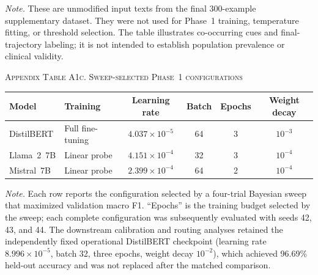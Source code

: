 \documentclass{ieeeaccess}
\begin{document}
\noindent\footnotesize\textit{Note.} These are unmodified input texts from the final 300-example supplementary dataset. They were not used for Phase~1 training, temperature fitting, or threshold selection. The table illustrates co-occurring cues and final-trajectory labeling; it is not intended to establish population prevalence or clinical validity.\normalsize
\par\medskip

\noindent\textsc{Appendix Table A1c. Sweep-selected Phase~1 configurations}\par
\label{tab:appendix-a1c-phase1-configurations}
\smallskip
\footnotesize
\setlength{\tabcolsep}{5pt}
\renewcommand{\arraystretch}{1.14}
\noindent\begin{tabularx}{\textwidth}{@{}>{\raggedright\arraybackslash}p{}>{\raggedright\arraybackslash}Y c c c c@{}}
\toprule
Model & Training & Learning rate & Batch & Epochs & Weight decay \\
\midrule
DistilBERT & Full fine-tuning & $4.037\times10^{-5}$ & 64 & 3 & $10^{-3}$ \\
Llama~2~7B & Linear probe & $4.151\times10^{-4}$ & 32 & 3 & $10^{-4}$ \\
Mistral~7B & Linear probe & $2.399\times10^{-4}$ & 64 & 2 & $10^{-4}$ \\
\bottomrule
\end{tabularx}
\par\smallskip
\normalsize

\noindent\footnotesize\textit{Note.} Each row reports the configuration selected by a four-trial Bayesian sweep that maximized validation macro F1. ``Epochs'' is the training budget selected by the sweep; each complete configuration was subsequently evaluated with seeds 42, 43, and 44. The downstream calibration and routing analyses retained the independently fixed operational DistilBERT checkpoint (learning rate $8.996\times10^{-5}$, batch 32, three epochs, weight decay $10^{-2}$), which achieved 96.69\% held-out accuracy and was not replaced after the matched comparison.\normalsize
\par\medskip
\end{document}
